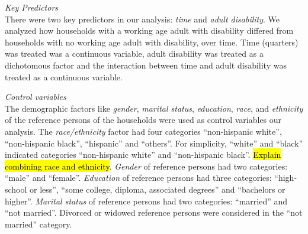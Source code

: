 \documentclass[11pt]{extarticle} %
\begin{document}
\noindent
{\emph{Key Predictors}}\\
There were two key predictors in our analysis: {\emph{time}} and {\emph{adult disability}}. We analyzed how households with a working age adult with disability differed from households with no working age adult with disability, over time. Time (quarters) was treated was a continuous variable, adult disability was treated as a dichotomous factor and the interaction between time and adult disability was treated as a continuous variable. 

\noindent
{\emph{Control variables}}\\
The demographic factors like {\emph{gender}}, {\emph{marital status}}, {\emph{education}}, {\emph{race}}, and {\emph{ethnicity}} of the reference persons of the households were used as control variables our analysis. The {\emph{race/ethnicity}} factor had four categories ``non-hispanic white'', ``non-hispanic black'', ``hispanic'' and ``others''. For simplicity, ``white'' and ``black'' indicated categories ``non-hispanic white'' and ``non-hispanic black''. {\hl{Explain combining race and ethnicity}}. {\emph{Gender}} of reference persons had two categories: ``male'' and ``female''. {\emph{Education}} of reference persons had three categories: ``high-school or less'', ``some college, diploma, associated degrees'' and ``bachelors or higher''. {\emph{Marital status}} of reference persons had two categories: ``married'' and ``not married''. Divorced or widowed reference persons were considered in the ``not married'' category.
\end{document}
